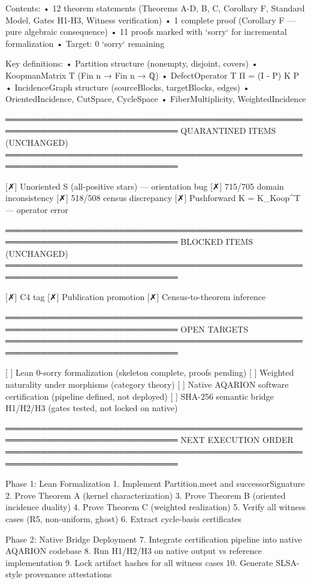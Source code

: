 Contents:
  • 12 theorem statements (Theorems A-D, B, C, Corollary F, Standard Model,
    Gates H1-H3, Witness verification)
  • 1 complete proof (Corollary F — pure algebraic consequence)
  • 11 proofs marked with `sorry` for incremental formalization
  • Target: 0 `sorry` remaining

Key definitions:
  • Partition structure (nonempty, disjoint, covers)
  • KoopmanMatrix T (Fin n → Fin n → ℚ)
  • DefectOperator T Π = (I - P) K P
  • IncidenceGraph structure (sourceBlocks, targetBlocks, edges)
  • OrientedIncidence, CutSpace, CycleSpace
  • FiberMultiplicity, WeightedIncidence

═══════════════════════════════════════════════════════════════════════════════
QUARANTINED ITEMS (UNCHANGED)
═══════════════════════════════════════════════════════════════════════════════

  [✗] Unoriented S (all-positive stars) — orientation bug
  [✗] 715/705 domain inconsistency
  [✗] 518/508 census discrepancy
  [✗] Pushforward K = K_Koop^T — operator error

═══════════════════════════════════════════════════════════════════════════════
BLOCKED ITEMS (UNCHANGED)
═══════════════════════════════════════════════════════════════════════════════

  [✗] C4 tag
  [✗] Publication promotion
  [✗] Census-to-theorem inference

═══════════════════════════════════════════════════════════════════════════════
OPEN TARGETS
═══════════════════════════════════════════════════════════════════════════════

  [ ] Lean 0-sorry formalization (skeleton complete, proofs pending)
  [ ] Weighted naturality under morphisms (category theory)
  [ ] Native AQARION software certification (pipeline defined, not deployed)
  [ ] SHA-256 semantic bridge H1/H2/H3 (gates tested, not locked on native)

═══════════════════════════════════════════════════════════════════════════════
NEXT EXECUTION ORDER
═══════════════════════════════════════════════════════════════════════════════

Phase 1: Lean Formalization
  1. Implement Partition.meet and successorSignature
  2. Prove Theorem A (kernel characterization)
  3. Prove Theorem B (oriented incidence duality)
  4. Prove Theorem C (weighted realization)
  5. Verify all witness cases (R5, non-uniform, ghost)
  6. Extract cycle-basis certificates

Phase 2: Native Bridge Deployment
  7. Integrate certification pipeline into native AQARION codebase
  8. Run H1/H2/H3 on native output vs reference implementation
  9. Lock artifact hashes for all witness cases
  10. Generate SLSA-style provenance attestations

